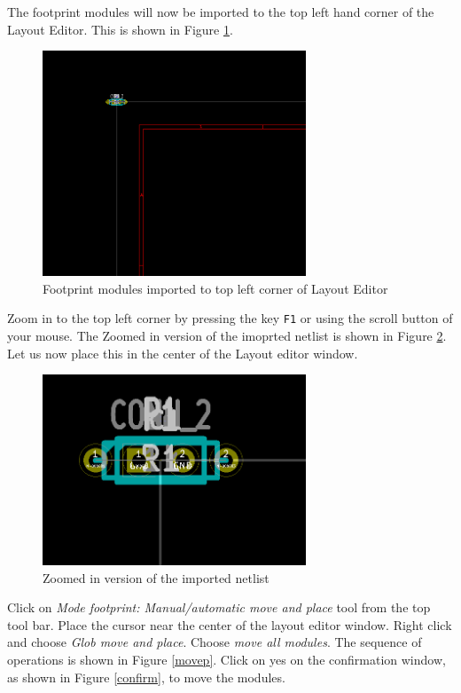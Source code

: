 The footprint modules will now be imported to the top left hand corner of the Layout Editor. This is shown in Figure \ref{netlisttop}.
\begin{figure}
\centering
\includegraphics[width=0.7\textwidth]{figures/netlisttop}
\caption{Footprint modules imported to top left corner of Layout Editor}
\label{netlisttop}
\end{figure}
Zoom in  to the top left corner by pressing the key {\tt F1} or using the scroll button of your mouse. The Zoomed in version of the imoprted netlist is shown in Figure \ref{zoom}. Let us now place this in the center of the Layout editor window.
\begin{figure}
\centering
\includegraphics[width=0.7\textwidth]{figures/zoom}
\caption{Zoomed in version of the imported netlist}
\label{zoom}
\end{figure}
Click on \textit{Mode footprint: Manual/automatic move and place} tool from the top tool bar. Place the cursor near the center of the layout editor window.
Right click and choose \textit{Glob move and place}. Choose \textit{move all modules}. The sequence of operations is shown in Figure \ref{movep}. Click on yes on the confirmation window, as shown in Figure \ref{confirm}, to move the modules.
